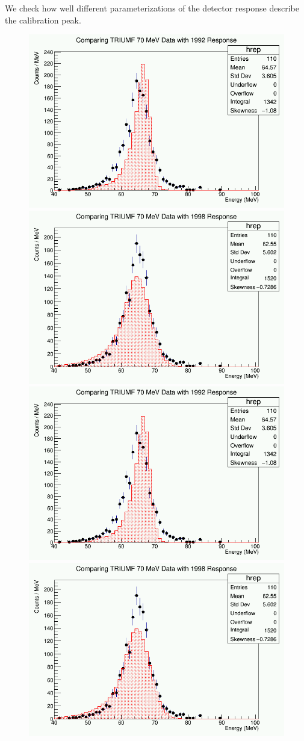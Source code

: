 \documentclass[12pt]{article}
\newcommand {\red}          {\color{red}}
\begin{document}
We check how well different parameterizations of the detector response describe the
calibration peak.
\begin{figure}[htbp]
 \begin{center}
 \includegraphics[width=0.49\columnwidth]{png/70MeV_vs_1992_Response} 
 \includegraphics[width=0.49\columnwidth]{png/70MeV_vs_1998_Response} 
 \includegraphics[width=0.49\columnwidth]{png/70MeV_vs_1992_Response} 
 \includegraphics[width=0.49\columnwidth]{png/70MeV_vs_1998_Response} 
 \end{center}
 \caption{\red{ \bf Caption}}
 \label{p004}
 \end{figure}

\end{document}
